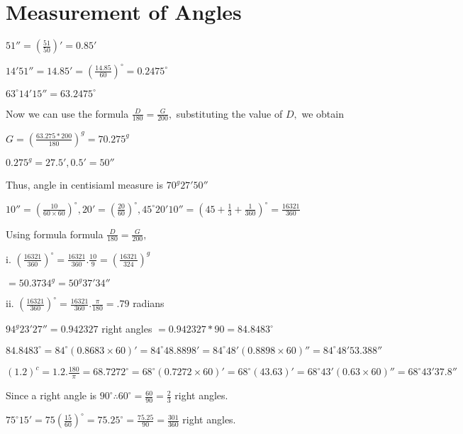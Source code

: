 \chapter{Measurement of Angles}
\startitemize[n, 1*broad]
\item $51'' = \left(\frac{51}{50}\right)' = 0.85'$

   $14'51'' = 14.85' = \left(\frac{14.85}{60}\right)^\circ = 0.2475^\circ$

   $63^\circ14'15'' = 63.2475^\circ$

   Now we can use the formula $\frac{D}{180} = \frac{G}{200},$ substituting the value of $D,$ we obtain

   $G = \left(\frac{63.275*200}{180}\right)^g = 70.275^g$

   $0.275^g = 27.5', 0.5' = 50''$

   Thus, angle in centisiaml measure is $70^g27'50''$

\item $10'' = \left(\frac{10}{60\times 60}\right)^\circ , 20' = \left(\frac{20}{60}\right)^\circ, 45^\circ 20'10'' = \left(45 +
   \frac{1}{3} + \frac{1}{360}\right)^\circ = \frac{16321}{360}$

   Using formula formula $\frac{D}{180} = \frac{G}{200},$

   i. $\left(\frac{16321}{360}\right)^\circ = \frac{16321}{360}.\frac{10}{9} = \left(\frac{16321}{324}\right)^g$

      $= 50.3734^g = 50^g37'34''$

   ii. $\left(\frac{16321}{360}\right)^\circ = \frac{16321}{360}.\frac{\pi}{180} = .79$ radians

\item $94^g23'27'' = 0.942327$ right angles $= 0.942327 * 90 = 84.8483^\circ$

   $84.8483^\circ = 84^\circ (0.8683\times 60)' = 84^\circ 48.8898' = 84^\circ48' (0.8898\times 60)'' = 84^\circ 48'53.388''$

\item $(1.2)^c = 1.2 . \frac{180}{\pi} = 68.7272^\circ = 68^\circ (0.7272\times 60)' = 68^\circ (43.63)' =
   68^\circ43'(0.63\times 60)'' = 68^\circ43'37.8''$

\item Since a right angle is $90^\circ \therefore 60^\circ = \frac{60}{90} = \frac{2}{3}$ right angles.

\item $75^\circ15' = 75\left(\frac{15}{60}\right)^\circ = 75.25^\circ = \frac{75.25}{90} = \frac{301}{360}$ right angles.

